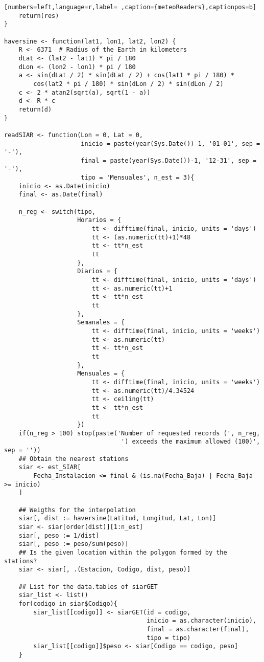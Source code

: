 \begin{lstlisting}[numbers=left,language=r,label= ,caption={meteoReaders},captionpos=b]
    return(res)
}

haversine <- function(lat1, lon1, lat2, lon2) {
    R <- 6371  # Radius of the Earth in kilometers
    dLat <- (lat2 - lat1) * pi / 180
    dLon <- (lon2 - lon1) * pi / 180
    a <- sin(dLat / 2) * sin(dLat / 2) + cos(lat1 * pi / 180) *
        cos(lat2 * pi / 180) * sin(dLon / 2) * sin(dLon / 2)
    c <- 2 * atan2(sqrt(a), sqrt(1 - a))
    d <- R * c
    return(d)
}

readSIAR <- function(Lon = 0, Lat = 0,
                     inicio = paste(year(Sys.Date())-1, '01-01', sep = '-'),
                     final = paste(year(Sys.Date())-1, '12-31', sep = '-'),
                     tipo = 'Mensuales', n_est = 3){
    inicio <- as.Date(inicio)
    final <- as.Date(final)

    n_reg <- switch(tipo,
                    Horarios = {
                        tt <- difftime(final, inicio, units = 'days')
                        tt <- (as.numeric(tt)+1)*48
                        tt <- tt*n_est
                        tt
                    },
                    Diarios = {
                        tt <- difftime(final, inicio, units = 'days')
                        tt <- as.numeric(tt)+1
                        tt <- tt*n_est
                        tt
                    },
                    Semanales = {
                        tt <- difftime(final, inicio, units = 'weeks')
                        tt <- as.numeric(tt)
                        tt <- tt*n_est
                        tt
                    },
                    Mensuales = {
                        tt <- difftime(final, inicio, units = 'weeks')
                        tt <- as.numeric(tt)/4.34524
                        tt <- ceiling(tt)
                        tt <- tt*n_est
                        tt
                    })
    if(n_reg > 100) stop(paste('Number of requested records (', n_reg,
                                ') exceeds the maximum allowed (100)', sep = ''))
    ## Obtain the nearest stations
    siar <- est_SIAR[
        Fecha_Instalacion <= final & (is.na(Fecha_Baja) | Fecha_Baja >= inicio)
    ]

    ## Weigths for the interpolation
    siar[, dist := haversine(Latitud, Longitud, Lat, Lon)]
    siar <- siar[order(dist)][1:n_est]
    siar[, peso := 1/dist]
    siar[, peso := peso/sum(peso)]
    ## Is the given location within the polygon formed by the stations?
    siar <- siar[, .(Estacion, Codigo, dist, peso)]

    ## List for the data.tables of siarGET
    siar_list <- list()
    for(codigo in siar$Codigo){
        siar_list[[codigo]] <- siarGET(id = codigo,
                                       inicio = as.character(inicio),
                                       final = as.character(final),
                                       tipo = tipo)
        siar_list[[codigo]]$peso <- siar[Codigo == codigo, peso]
    }


\end{lstlisting}
